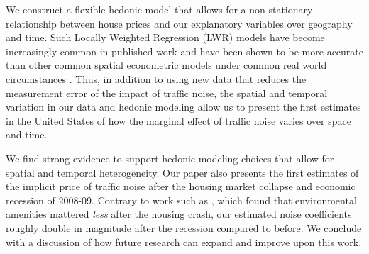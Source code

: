 \documentclass{article}\usepackage{graphicx, color}
\begin{document}

We construct a flexible hedonic model that allows for a non-stationary relationship between house prices and our explanatory variables over geography and time. Such Locally Weighted Regression (LWR) models have become increasingly common in published work \citep[see][]{MarmolejoDuarteCarlos;GonzalezTamez2009, Carruthers2010, Sunding2010, Nappi-Choulet2011} and have been shown to be more accurate than other common spatial econometric models under common real world circumstances \citep{McMillen2012}. Thus, in addition to using new data that reduces the measurement error of the impact of traffic noise, the spatial and temporal variation in our data and hedonic modeling allow us to present the first estimates in the United States of how the marginal effect of traffic noise varies over space and time.

We find strong evidence to support hedonic modeling choices that allow for spatial and temporal heterogeneity. Our paper also presents the first estimates of the implicit price of traffic noise after the housing market collapse and economic recession of 2008-09. Contrary to work such as \citet{Cho2011b}, which found that environmental amenities mattered \emph{less} after the housing crash, our estimated noise coefficients roughly double in magnitude after the recession compared to before. We conclude with a discussion of how future research can expand and improve upon this work.
 
\end{document}
